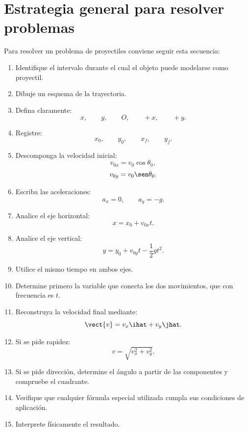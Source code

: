 \section{Estrategia general para resolver problemas}

\begin{estrategia}
Para resolver un problema de proyectiles conviene seguir esta secuencia:

\begin{enumerate}
    \item Identifique el intervalo durante el cual el objeto puede modelarse como
    proyectil.

    \item Dibuje un esquema de la trayectoria.

    \item Defina claramente:
    \[
    x,\qquad y,\qquad O,\qquad +x,\qquad +y.
    \]

    \item Registre:
    \[
    x_0,\qquad y_0,\qquad x_f,\qquad y_f.
    \]

    \item Descomponga la velocidad inicial:
    \[
    v_{0x}=v_0\cos\theta_0,
    \]
    \[
    v_{0y}=v_0\sen\theta_0.
    \]

    \item Escriba las aceleraciones:
    \[
    a_x=0,
    \qquad
    a_y=-g.
    \]

    \item Analice el eje horizontal:
    \[
    x=x_0+v_{0x}t.
    \]

    \item Analice el eje vertical:
    \[
    y=y_0+v_{0y}t-\frac{1}{2}gt^2.
    \]

    \item Utilice el mismo tiempo en ambos ejes.

    \item Determine primero la variable que conecta los dos movimientos, que con
    frecuencia es \(t\).

    \item Reconstruya la velocidad final mediante:
    \[
    \vect{v}=v_x\ihat+v_y\jhat.
    \]

    \item Si se pide rapidez:
    \[
    v=\sqrt{v_x^2+v_y^2}.
    \]

    \item Si se pide dirección, determine el ángulo a partir de las componentes y
    compruebe el cuadrante.

    \item Verifique que cualquier fórmula especial utilizada cumpla sus
    condiciones de aplicación.

    \item Interprete físicamente el resultado.
\end{enumerate}
\end{estrategia}


